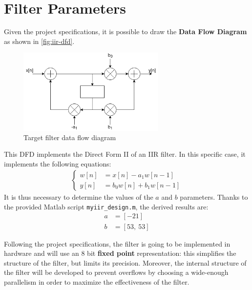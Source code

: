 \section{Filter Parameters}
Given the project specifications, it is possible to draw the \textbf{Data Flow Diagram} as shown in \autoref{fig:iir-dfd}.
\begin{figure}[htbp]
	\centering
	\includegraphics[width=0.65\textwidth]{chapter1/images/iir-dfd.png}
	\caption{Target filter data flow diagram}
	\label{fig:iir-dfd}
\end{figure}

This DFD implements the Direct Form II of an IIR filter. In this specific case, it implements the following equations:
\begin{align}
	\begin{cases}
		w[n] &= x[n] - a_1 w[n-1] 		\\
		y[n] &= b_0 w[n] + b_1 w[n-1]
	\end{cases}
	\label{eqn:iir}
\end{align}
It is thus necessary to determine the values of the $a$ and $b$ parameters. Thanks to the provided Matlab script \texttt{myiir\_design.m}, the derived results are:
\begin{align}
    a &= [-21] \\
    b &= [53,\ 53]
\end{align}

Following the project specifications, the filter is going to be implemented in hardware and will use an 8 bit \textbf{fixed point} representation: this simplifies the structure of the filter, but limits its precision. Moreover, the internal structure of the filter will be developed to prevent overflows by choosing a wide-enough parallelism in order to maximize the effectiveness of the filter.

